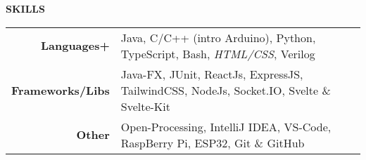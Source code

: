 \begin{rSection}{\small \normalfont \textbf {SKILLS}}

\begin{tabular}{ r l }

 \textbf{Languages+} & Java, C/C++ (intro Arduino),  Python, TypeScript, Bash, \textit{ \scriptsize HTML/CSS}, Verilog \\ 
 \textbf{Frameworks/Libs} & Java-FX, JUnit, ReactJs, ExpressJS, TailwindCSS, NodeJs, Socket.IO, Svelte \& Svelte-Kit \\
 \textbf{Other} & {Open-Processing, IntelliJ IDEA, VS-Code, RaspBerry Pi, ESP32, Git \& GitHub}
\end{tabular}



\end{rSection}